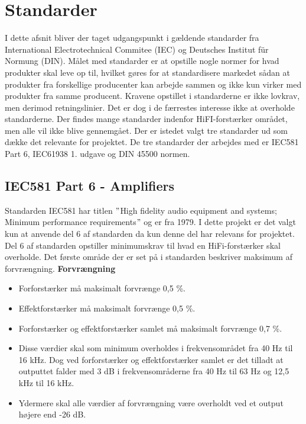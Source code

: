 \section{Standarder}
I dette afsnit bliver der taget udgangspunkt i gældende standarder fra International Electrotechnical Commitee (IEC) og Deutsches Institut f\"{u}r Normung (DIN). Målet med standarder er at opstille nogle normer for hvad produkter skal leve op til, hvilket gøres for at standardisere markedet sådan at produkter fra forskellige producenter kan arbejde sammen og ikke kun virker med produkter fra samme producent. Kravene opstillet i standarderne er ikke lovkrav, men derimod retningslinier. Det er dog i de færrestes interesse ikke at overholde standarderne.
\newline
\newline
Der findes mange standarder indenfor HiFI-forstærker området, men alle vil ikke blive gennemgået. Der er istedet valgt tre standarder ud som dække det relevante for projektet. De tre standarder der arbejdes med er IEC581 Part 6, IEC61938 1. udgave og DIN 45500 normen. 

\subsection*{IEC581 Part 6 - Amplifiers}
\label{IEC581}
Standarden IEC581 har titlen $"$High fidelity audio equipment and systems; Minimum performance requirements$"$ og er fra 1979. I dette projekt er det valgt kun at anvende del 6 af standarden da kun denne del har relevans for projektet. Del 6 af standarden opstiller minimumskrav til hvad en HiFi-forstærker skal overholde. \cite{IEC581-6}%
\newline
\newline
Det første område der er set på i standarden beskriver maksimum af forvrængning.
\newline 
\newline
\textbf{Forvrængning}
\begin{itemize}
\item Forforstærker må maksimalt forvrænge 0,5 \%.
\item Effektforstærker må maksimalt forvrænge 0,5 \%.
\item Forforstærker og effektforstærker samlet må maksimalt forvrænge 0,7 \%.
\item Disse værdier skal som minimum overholdes i frekvensområdet fra 40 Hz til 16 kHz. Dog ved forforstærker og effektforstærker samlet er det tilladt at outputtet falder med 3 dB i frekvensområderne fra 40 Hz til 63 Hz og 12,5 kHz til 16 kHz. 
\item Ydermere skal alle værdier af forvrængning være overholdt ved et output højere end -26 dB.
\end{itemize}

